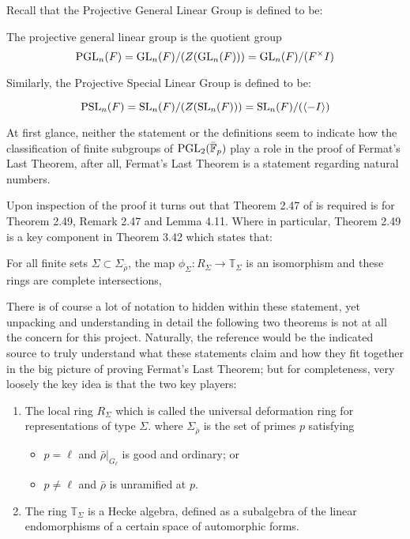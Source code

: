Recall that the Projective General Linear Group is defined to be:

\begin{definition}
    The projective general linear group is the quotient group
    \[    
    \operatorname{PGL}_n(F) = \operatorname{GL}_n(F) / (Z(\operatorname{GL}_n(F))) = \operatorname{GL}_n(F) / (F^\times I) 
    \]
\end{definition}

Similarly, the Projective Special Linear Group is defined to be:

\begin{lemma}
    \[
    \operatorname{PSL}_n(F) = \operatorname{SL}_n(F) / (Z(\operatorname{SL}_n(F))) = \operatorname{SL}_n(F) / (\langle -I\rangle)
    \]
\end{lemma}

At first glance, neither the statement or the definitions seem to indicate how the classification of finite subgroups of $\operatorname{PGL}_2(\bar{\mathbb{F}}_p)$ play a role in the proof of Fermat's Last Theorem, after all, Fermat's Last Theorem is a statement
regarding natural numbers. 

Upon inspection of the proof it turns out that Theorem 2.47 of \cite{dtt} is required is for Theorem 2.49, Remark 2.47 and Lemma 4.11. Where in particular, Theorem 2.49 is a key component in Theorem 3.42 which states that:

\begin{theorem}[Theorem 3.42]
    For all finite sets $\Sigma \subset \Sigma_{\bar{\rho}}$, the map $\phi_\Sigma : R_\Sigma \rightarrow \mathbb{T}_\Sigma$ is an isomorphism and these rings are complete intersections,
\end{theorem}

There is of course a lot of notation to hidden within these statement, yet unpacking and understanding in detail the following two theorems is not at all the concern for this project. 
Naturally, the reference \cite{dtt} would be the indicated source to truly understand what these statements claim and how they fit together in the big picture of proving Fermat's Last Theorem; but for completeness,
very loosely the key idea is that the two key players:

\begin{enumerate}
    \item The local ring $R_\Sigma$ which is called the universal deformation ring for representations of type $\Sigma$.
    where $\Sigma_{\bar{\rho}}$ is the set of primes $p$ satisfying
    \begin{itemize}
        \item $p = \ell$ and $\bar{\rho}|_{G_{\ell}}$ is good and ordinary; or
        \item $p \ne \ell$ and $\bar{\rho}$ is unramified at $p$.
    \end{itemize}
    \item The ring $\mathbb{T}_\Sigma$ is a Hecke algebra, defined as a subalgebra of the linear endomorphisms of a certain space of automorphic forms.
\end{enumerate}

